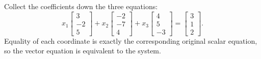 Collect the coefficients down the three equations:
\[
x_1\begin{bmatrix}3\\-2\\5\end{bmatrix}
+x_2\begin{bmatrix}-2\\-7\\4\end{bmatrix}
+x_3\begin{bmatrix}4\\5\\-3\end{bmatrix}
=\begin{bmatrix}3\\1\\2\end{bmatrix}.
\]
Equality of each coordinate is exactly the corresponding original scalar
equation, so the vector equation is equivalent to the system.

